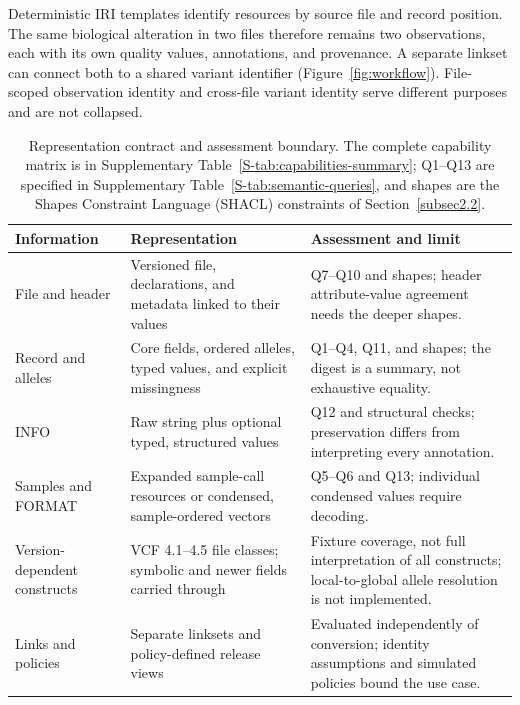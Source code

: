 \documentclass[pdflatex,sn-mathphys-num]{sn-jnl}
\begin{document}
Deterministic IRI templates identify resources by source file and record position. 
The same biological alteration in two files therefore remains two observations, each with its own quality values, annotations, and provenance. 
A separate linkset can connect both to a shared variant identifier (Figure~\ref{fig:workflow}). 
File-scoped observation identity and cross-file variant identity serve different purposes and are not collapsed.

\begin{table}[!htbp]
\caption{
  Representation contract and assessment boundary. 
  The complete capability matrix is in Supplementary Table~\ref{S-tab:capabilities-summary}; Q1--Q13 are specified in Supplementary Table~\ref{S-tab:semantic-queries}, and shapes are the Shapes Constraint Language (SHACL) constraints of Section~\ref{subsec2.2}.}\label{tab:contract}
\centering\small
\setlength{\tabcolsep}{4pt}\renewcommand{\arraystretch}{1.15}
\begin{tabularx}{\textwidth}{@{}>{\raggedright\arraybackslash}p{}>{\raggedright\arraybackslash}X>{\raggedright\arraybackslash}X@{}}
\toprule
\textbf{Information} & \textbf{Representation} & \textbf{Assessment and limit}\\
\midrule
File and header & Versioned file, declarations, and metadata linked to their values & Q7--Q10 and shapes; header attribute-value agreement needs the deeper shapes.\\
\addlinespace
Record and alleles & Core fields, ordered alleles, typed values, and explicit missingness & Q1--Q4, Q11, and shapes; the digest is a summary, not exhaustive equality.\\
\addlinespace
INFO & Raw string plus optional typed, structured values & Q12 and structural checks; preservation differs from interpreting every annotation.\\
\addlinespace
Samples and FORMAT & Expanded sample-call resources or condensed, sample-ordered vectors & Q5--Q6 and Q13; individual condensed values require decoding.\\
\addlinespace
Version-dependent constructs & VCF 4.1--4.5 file classes; symbolic and newer fields carried through & Fixture coverage, not full interpretation of all constructs; local-to-global allele resolution is not implemented.\\
\addlinespace
Links and policies & Separate linksets and policy-defined release views & Evaluated independently of conversion; identity assumptions and simulated policies bound the use case.\\
\bottomrule
\end{tabularx}
\end{table}
\end{document}
